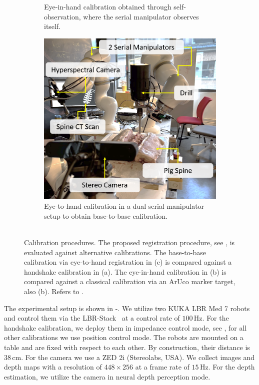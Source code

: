 \begin{figure}[tb]
\begin{subfigure}[b]{0.3\textwidth}
         \caption{Eye-in-hand calibration obtained through self-observation, where the serial manipulator observes itself.\\}
         \label{c1:fig:eye_in_hand}
     \end{subfigure}
     \hfill
     \begin{subfigure}[b]{0.3\textwidth}
         \centering
         \includegraphics[width=\textwidth]{fig/eye_to_hand.png}
         \caption{Eye-to-hand calibration in a dual serial manipulator setup to obtain base-to-base calibration.\\\\}
         \label{c1:fig:eye_to_hand}
     \end{subfigure}
    \caption{Calibration procedures. The proposed registration procedure, see , is evaluated against alternative calibrations. The base-to-base calibration via eye-to-hand registration in (c) is compared against a handshake calibration in (a). The eye-in-hand calibration in (b) is compared against a classical calibration via an ArUco marker target, also (b). Refers to .}
    \label{c1:fig:calibrations}
\end{figure}

The experimental setup is shown in -. We utilize two KUKA LBR Med 7 robots and control them via the LBR-Stack~\cite{huber2023lbr} at a control rate of $100\,\text{Hz}$. For the handshake calibration, we deploy them in impedance control mode, see , for all other calibrations we use position control mode. The robots are mounted on a table and are fixed with respect to each other. By construction, their distance is $38\,\text{cm}$. For the camera we use a ZED 2i (Stereolabs, USA). We collect images and depth maps with a resolution of $448 \times 256$ at a frame rate of $15\,\text{Hz}$. For the depth estimation, we utilize the camera in neural depth perception mode.

